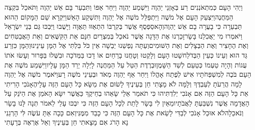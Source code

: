 \documentclass[../main/main.tex]{subfiles}
\begin{document}
\begin{multicols}{\ncols}
וַיְהִי הָעָם כְּמִתְאֹנְנִים רַע בְּאָזְנֵי יַהְוֶה וַיִּשְׁמַע יַהְוֶה וַיִּחַר אַפּוֹ וַתִּבְעַר בָּם אֵשׁ יַהְוֶה וַתֹּאכַל בִּקְצֵה הַמַּחֲנֶה\PreVerseSpace{}וַיִּצְעַק הָעָם אֶל מֹשֶׁה וַיִּתְפַּלֵּל מֹשֶׁה אֶל יַהְוֶה וַתִּשְׁקַע הָאֵשׁ\PreVerseSpace{}וַיִּקְרָא שֵׁם הַמָּקוֹם הַהוּא תַּבְעֵרָה כִּי בָעֲרָה בָם אֵשׁ יַהְוֶה\PreVerseSpace{}וְהָאסַפְסֻף אֲשֶׁר בְּקִרְבּוֹ הִתְאַוּוּ תַּאֲוָה וַיָּשֻׁבוּ וַיִּבְכּוּ גַּם בְּנֵי יִשְׂרָאֵל וַיֹּאמְרוּ מִי יַאֲכִלֵנוּ בָּשָׂר\PreVerseSpace{}זָכַרְנוּ אֶת הַדָּגָה אֲשֶׁר נֹאכַל בְּמִצְרַיִם חִנָּם אֵת הַקִּשֻּׁאִים וְאֵת הָאֲבַטִּחִים וְאֶת הֶחָצִיר וְאֶת הַבְּצָלִים וְאֶת הַשּׁוּמִים\PreVerseSpace{}וְעַתָּה נַפְשֵׁנוּ יְבֵשָׁה אֵין כֹּל בִּלְתִּי אֶל הַמָּן עֵינֵינוּ\PreVerseSpace{}וְהַמָּן כִּזְרַע גַּד הוּא וְעֵינוֹ כְּעֵין הַבְּדֹלַח\PreVerseSpace{}שָׁטוּ הָעָם וְלָקְטוּ וְטָחֲנוּ בָרֵחַיִם אוֹ דָכוּ בַּמְּדֹכָה וּבִשְּׁלוּ בַּפָּרוּר וְעָשׂוּ אֹתוֹ עֻגוֹת וְהָיָה טַעְמוֹ כְּטַעַם לְשַׁד הַשָּׁמֶן\PreVerseSpace{}וּבְרֶדֶת הַטַּל עַל הַמַּחֲנֶה לָיְלָה יֵרֵד הַמָּן עָלָיו\PreVerseSpace{}וַיִּשְׁמַע מֹשֶׁה אֶת הָעָם בֹּכֶה לְמִשְׁפְּחֹתָיו אִישׁ לְפֶתַח אָהֳלוֹ וַיִּחַר אַף יַהְוֶה מְאֹד וּבְעֵינֵי מֹשֶׁה רָע\PreVerseSpace{}וַיֹּאמֶר מֹשֶׁה אֶל יַהְוֶה לָמָה הֲרֵעֹתָ לְעַבְדֶּךָ וְלָמָּה לֹא מָצָתִי חֵן בְּעֵינֶיךָ לָשׂוּם אֶת מַשָּׂא כָּל הָעָם הַזֶּה עָלָי\PreVerseSpace{}הֶאָנֹכִי הָרִיתִי אֵת כָּל הָעָם הַזֶּה אִם אָנֹכִי יְלִדְתִּיהוּ כִּי תֹאמַר אֵלַי שָׂאֵהוּ בְחֵיקֶךָ כַּאֲשֶׁר יִשָּׂא הָאֹמֵן אֶת הַיֹּנֵק עַל הָאֲדָמָה אֲשֶׁר נִשְׁבַּעְתָּ לַאֲבֹתָיו\PreVerseSpace{}מֵאַיִן לִי בָּשָׂר לָתֵת לְכָל הָעָם הַזֶּה כִּי יִבְכּוּ עָלַי לֵאמֹר תְּנָה לָּנוּ בָשָׂר וְנֹאכֵלָה\PreVerseSpace{}לֹא אוּכַל אָנֹכִי לְבַדִּי לָשֵׂאת אֶת כָּל הָעָם הַזֶּה כִּי כָבֵד מִמֶּנִּי\PreVerseSpace{}וְאִם כָּכָה אַתָּ עֹשֶׂה לִּי הָרְגֵנִי נָא הָרֹג אִם מָצָאתִי חֵן בְּעֵינֶיךָ וְאַל אֶרְאֶה בְּרָעָתִי\OpenSection{}\par

\end{multicols}
\end{document}
